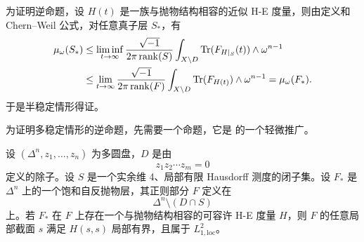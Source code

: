 为证明逆命题，设 \(H(t)\) 是一族与抛物结构相容的近似 H-E 度量，则由定义和 Chern--Weil 公式，对任意真子层 \(S_*\)，有
\begin{align*}
    \mu_\omega(S_*)
&\le
\liminf_{t\to\infty}
\frac{\sqrt{-1}}{2\pi \operatorname{rank}(S)}
\int_{X\setminus D}\operatorname{Tr}(F_{H|_S}(t))\wedge \omega^{n-1}\\
&\le
\lim_{t\to\infty}
\frac{\sqrt{-1}}{2\pi \operatorname{rank}(F)}
\int_{X\setminus D}\operatorname{Tr}(F_{H(t)})\wedge \omega^{n-1}
=
\mu_\omega(F_*).
\end{align*}
于是半稳定情形得证。

为证明多稳定情形的逆命题，先需要一个命题，它是 \cite[Theorem 2(b)]{B-S} 的一个轻微推广。

\begin{proposition}
设 \((\Delta^n,z_1,\dots,z_n)\) 为多圆盘，\(D\) 是由
\[
z_1z_2\cdots z_m=0
\]
定义的除子。设 \(S\) 是一个实余维 4、局部有限 Hausdorff 测度的闭子集。设 \(F_*\) 是 \(\Delta^n\) 上的一个饱和自反抛物层，其正则部分 \(F\) 定义在
\[
\Delta^n\setminus (D\cap S)
\]
上。若 \(F_*\) 在 \(F\) 上存在一个与抛物结构相容的可容许 H-E 度量 \(H\)，则 \(F\) 的任意局部截面 \(s\) 满足 \(H(s,s)\) 局部有界，且属于 \(L_{1,\mathrm{loc}}^2\)。
\end{proposition}

